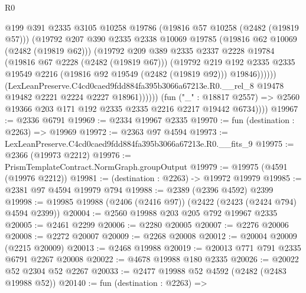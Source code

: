 \begin{lexlean}{R0}
\begin{coremodule}
                          @199
                          @391
                          @2335
                          @3105
                          @10258
                          @19786
                          (@19816 @57 @10258 (@2482 (@19819 @57)))
                          (@19792
                            @207
                            @390
                            @2335
                            @2338
                            @10069
                            @19785
                            (@19816 @62 @10069 (@2482 (@19819 @62)))
                            (@19792
                              @209
                              @389
                              @2335
                              @2337
                              @2228
                              @19784
                              (@19816 @67 @2228 (@2482 (@19819 @67)))
                              (@19792
                                @219
                                @192
                                @2335
                                @2335
                                @19549
                                @2216
                                (@19816 @92 @19549 (@2482 (@19819 @92)))
                                @19846))))))
                    (LexLeanPreserve.C4cd0caed9fdd884fa395b3066a67213e.R0.__rel_8
                      @19478
                      @19482
                      @2221
                      @2224
                      @2227
                      @18961))))))
          (fun ("_" : @18817 @2557) =>
          @2560 @19366 @203 @171 @192 @2335 @2335 @2216 @2217 @19442 @6734))))
@19967 := @2336 @6791
@19969 := @2334 @19967 @2335
@19970 := fun (destination : @2263) => @19969
@19972 := @2363 @97 @4594
@19973 := LexLeanPreserve.C4cd0caed9fdd884fa395b3066a67213e.R0.__fits_9
@19975 := @2366 (@19973 @2212)
@19976 := PrismTemplateContract.NormGraph.groupOutput
@19979 := @19975 (@4591 (@19976 @2212))
@19981 := (destination : @2263) -> @19972 @19979
@19985 := @2381 @97 @4594 @19979 @794
@19988 := @2389 (@2396 @4592) @2399
@19998 := @19985 @19988 (@2406 (@2416 @97)) (@2422 (@2423 (@2424 @794) @4594 @2399))
@20004 := @2560 @19988 @203 @205 @792 @19967 @2335
@20005 := @2461 @2299
@20006 := @2280 @20005
@20007 := @2276 @20006
@20008 := @2272 @20007
@20009 := @2268 @20008
@20012 := @20004 @20009 (@2215 @20009)
@20013 := @2468 @19988
@20019 := @20013 @771 @791 @2335 @6791 @2267 @20008
@20022 := @4678 @19988 @180 @2335
@20026 := @20022 @52 @2304 @52 @2267
@20033 := @2477 @19988 @52 @4592 (@2482 (@2483 @19988 @52))
@20140 := fun (destination : @2263) =>

\end{coremodule}
\end{lexlean}
